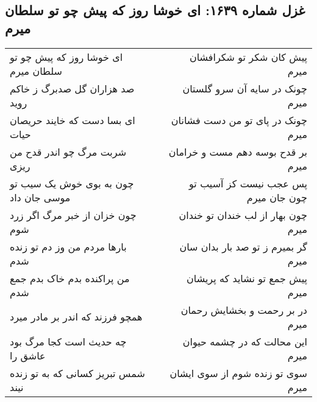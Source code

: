 \begin{center}
\section*{غزل شماره ۱۶۳۹: ای خوشا روز که پیش چو تو سلطان میرم}
\label{sec:1639}
\begin{longtable}{l p{0.5cm} r}
ای خوشا روز که پیش چو تو سلطان میرم
&&
پیش کان شکر تو شکرافشان میرم
\\
صد هزاران گل صدبرگ ز خاکم روید
&&
چونک در سایه آن سرو گلستان میرم
\\
ای بسا دست که خایند حریصان حیات
&&
چونک در پای تو من دست فشانان میرم
\\
شربت مرگ چو اندر قدح من ریزی
&&
بر قدح بوسه دهم مست و خرامان میرم
\\
چون به بوی خوش یک سیب تو موسی جان داد
&&
پس عجب نیست کز آسیب تو چون جان میرم
\\
چون خزان از خبر مرگ اگر زرد شوم
&&
چون بهار از لب خندان تو خندان میرم
\\
بارها مردم من وز دم تو زنده شدم
&&
گر بمیرم ز تو صد بار بدان سان میرم
\\
من پراکنده بدم خاک بدم جمع شدم
&&
پیش جمع تو نشاید که پریشان میرم
\\
همچو فرزند که اندر بر مادر میرد
&&
در بر رحمت و بخشایش رحمان میرم
\\
چه حدیث است کجا مرگ بود عاشق را
&&
این محالت که در چشمه حیوان میرم
\\
شمس تبریز کسانی که به تو زنده نیند
&&
سوی تو زنده شوم از سوی ایشان میرم
\\
\end{longtable}
\end{center}
